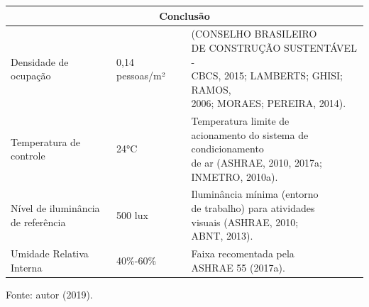 \begin{table}[ht]\centering
        \begin{tabular*}{\columnwidth}{@{\extracolsep{\fill}}lll}
        \hline
        \multicolumn{3}{c}{Conclusão}\\\hline
        Densidade de ocupação                             & 0,14 pessoas/m²    & \makecell[l]{(CONSELHO BRASILEIRO\\ DE CONSTRUÇÃO 
                                                                                SUSTENTÁVEL -\\ CBCS, 2015; LAMBERTS; 
                                                                                GHISI; RAMOS,\\ 2006; MORAES; PEREIRA, 2014).} \\ \hline
        Temperatura de controle                           & 24°C               & \makecell[l]{Temperatura limite de\\ acionamento
                                                                                do sistema de condicionamento\\ de ar (ASHRAE, 
                                                                                2010, 2017a;\\ INMETRO, 2010a).} \\ \hline
        \makecell[l]{Nível de iluminância\\ de referência}& 500 lux            & \makecell[l]{Iluminância mínima (entorno\\ de 
                                                                                trabalho) para atividades\\ visuais 
                                                                                (ASHRAE, 2010;\\ ABNT, 2013).} \\ \hline
        \makecell[l]{Umidade Relativa\\ Interna}          & 40\%-60\%          & \makecell[l]{Faixa recomentada pela\\
                                                                                ASHRAE 55 (2017a).}\\ \hline
    \end{tabular*}
    \begin{flushleft}
        \par \small Fonte: autor (2019).
    \end{flushleft}
\end{table}\newline